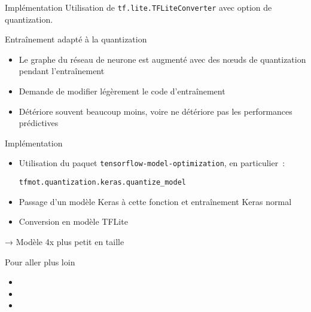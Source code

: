 \begin{frame}{Implémentation}
  Utilisation de \texttt{tf.lite.TFLiteConverter} avec option de quantization.
\end{frame}

\begin{frame}{Entraînement adapté à la quantization}
  \begin{itemize}
    \item Le graphe du réseau de neurone est augmenté avec des nœuds de quantization pendant l'entraînement
    \item Demande de modifier légèrement le code d'entraînement
    \item Détériore souvent beaucoup moins, voire ne détériore pas les performances prédictives
  \end{itemize}
\end{frame}

\begin{frame}{Implémentation}
  \begin{itemize}
    \item Utilisation du paquet \texttt{tensorflow-model-optimization}, en particulier~:

    \texttt{tfmot.quantization.keras.quantize\_model}
    \item Passage d'un modèle Keras à cette fonction et entraînement Keras normal
    \item Conversion en modèle TFLite
  \end{itemize}
  → Modèle 4x plus petit en taille
\end{frame}

\begin{frame}{Pour aller plus loin}
  \begin{itemize}
    \item {}
    \item {}
    \item {}
  \end{itemize}
\end{frame}